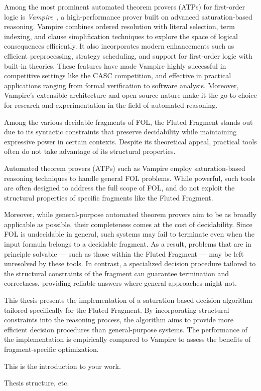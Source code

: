 Among the most prominent automated theorem provers (ATPs) for first-order logic is \textit{Vampire}~\cite{kovacs2013vampire}, a high-performance prover built on advanced saturation-based reasoning.
Vampire combines ordered resolution with literal selection, term indexing, and clause simplification techniques to explore the space of logical consequences efficiently.
It also incorporates modern enhancements such as efficient preprocessing, strategy scheduling, and support for first-order logic with built-in theories.
These features have made Vampire highly successful in competitive settings like the CASC competition, and effective in practical applications ranging from formal verification to software analysis.
Moreover, Vampire's extensible architecture and open-source nature make it the go-to choice for research and experimentation in the field of automated reasoning.

Among the various decidable fragments of FOL, the Fluted Fragment stands out due to its syntactic constraints that preserve decidability while maintaining expressive power in certain contexts. Despite its theoretical appeal, practical tools often do not take advantage of its structural properties.

Automated theorem provers (ATPs) such as Vampire employ saturation-based reasoning techniques to handle general FOL problems. While powerful, such tools are often designed to address the full scope of FOL, and do not exploit the structural properties of specific fragments like the Fluted Fragment.

Moreover, while general-purpose automated theorem provers aim to be as broadly applicable as possible, their completeness comes at the cost of decidability. Since FOL is undecidable in general, such systems may fail to terminate even when the input formula belongs to a decidable fragment. As a result, problems that are in principle solvable — such as those within the Fluted Fragment — may be left unresolved by these tools. In contrast, a specialized decision procedure tailored to the structural constraints of the fragment can guarantee termination and correctness, providing reliable answers where general approaches might not.

This thesis presents the implementation of a saturation-based decision algorithm tailored specifically for the Fluted Fragment. By incorporating structural constraints into the reasoning process, the algorithm aims to provide more efficient decision procedures than general-purpose systems. The performance of the implementation is empirically compared to Vampire to assess the benefits of fragment-specific optimization.

This is the introduction to your work.
\blindtext[3]


\blindtext[3]


Thesis structure, etc.
